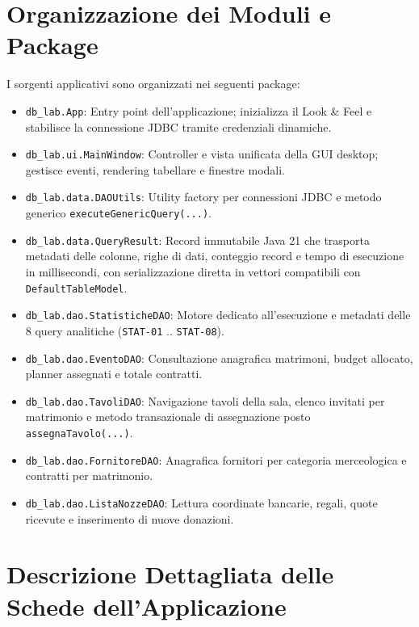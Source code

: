 \section{Organizzazione dei Moduli e Package}
I sorgenti applicativi sono organizzati nei seguenti package:
\begin{itemize}[noitemsep]
    \item \texttt{db\_lab.App}: Entry point dell'applicazione; inizializza il Look \& Feel e stabilisce la connessione JDBC tramite credenziali dinamiche.
    \item \texttt{db\_lab.ui.MainWindow}: Controller e vista unificata della GUI desktop; gestisce eventi, rendering tabellare e finestre modali.
    \item \texttt{db\_lab.data.DAOUtils}: Utility factory per connessioni JDBC e metodo generico \texttt{executeGenericQuery(...)}.
    \item \texttt{db\_lab.data.QueryResult}: Record immutabile Java 21 che trasporta metadati delle colonne, righe di dati, conteggio record e tempo di esecuzione in millisecondi, con serializzazione diretta in vettori compatibili con \texttt{DefaultTableModel}.
    \item \texttt{db\_lab.dao.StatisticheDAO}: Motore dedicato all'esecuzione e metadati delle 8 query analitiche (\texttt{STAT-01} .. \texttt{STAT-08}).
    \item \texttt{db\_lab.dao.EventoDAO}: Consultazione anagrafica matrimoni, budget allocato, planner assegnati e totale contratti.
    \item \texttt{db\_lab.dao.TavoliDAO}: Navigazione tavoli della sala, elenco invitati per matrimonio e metodo transazionale di assegnazione posto \texttt{assegnaTavolo(...)}.
    \item \texttt{db\_lab.dao.FornitoreDAO}: Anagrafica fornitori per categoria merceologica e contratti per matrimonio.
    \item \texttt{db\_lab.dao.ListaNozzeDAO}: Lettura coordinate bancarie, regali, quote ricevute e inserimento di nuove donazioni.
\end{itemize}

\section{Descrizione Dettagliata delle Schede dell'Applicazione}

